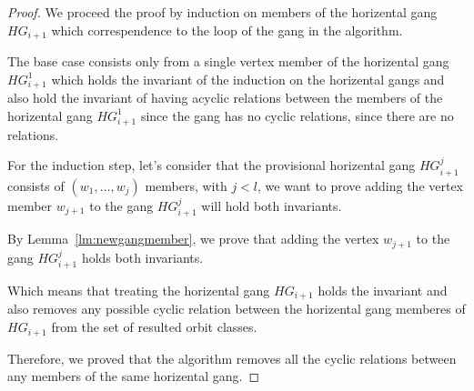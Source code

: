 \begin{proof}
    We proceed the proof by induction on members of the horizental gang $HG_{i+1}$ which correspendence to the loop of the gang in 
    the algorithm.

    The base case consists only from a single vertex member of the horizental gang $HG_{i+1}^1$ which holds the invariant of the induction on 
    the horizental gangs and also hold the invariant of having acyclic relations between the members of the horizental gang $HG_{i+1}^1$
    since the gang has no cyclic relations, since there are no relations. 

    For the induction step, let's consider that the provisional horizental gang $HG_{i+1}^j$ consists of $\left( w_1, \ldots, w_j \right)$ members,
    with $ j < l$, we want to prove adding the vertex member $w_{j+1}$ to the gang $HG_{i+1}^j$ will hold both invariants. 

    By Lemma~\ref{lm:newgangmember}, we prove that adding the vertex $w_{j+1}$ to the gang $HG_{i+1}^j$ holds both invariants.  
    
Which means that treating the horizental gang $HG_{i+1}$ holds the invariant and also removes any possible cyclic relation between the horizental
gang memberes of $HG_{i+1}$ from the set of resulted orbit classes. 

Therefore, we proved that the algorithm removes all the cyclic relations between any members of the same horizental gang. 
\end{proof}







